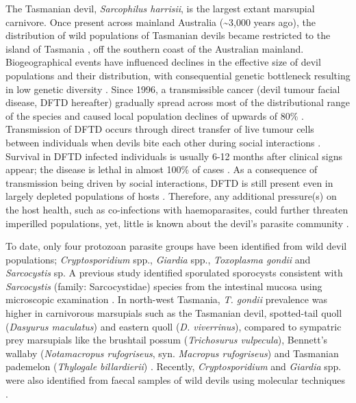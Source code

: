 \documentclass[a4paper, nobind]{templates/ociamthesis}
\begin{document}
The Tasmanian devil, \emph{Sarcophilus harrisii}, is the largest extant marsupial carnivore. Once present across mainland Australia (\textasciitilde3,000 years ago), the distribution of wild populations of Tasmanian devils became restricted to the island of Tasmania \autocite{bruniche-olsenAncientDNATracks2018}, off the southern coast of the Australian mainland. Biogeographical events have influenced declines in the effective size of devil populations and their distribution, with consequential genetic bottleneck resulting in low genetic diversity \autocite{jonesGeneticDiversityPopulation2004,bruniche-olsenAncientDNATracks2018,pattonContemporaryDemographicReconstruction2019}. Since 1996, a transmissible cancer (devil tumour facial disease, DFTD hereafter) gradually spread across most of the distributional range of the species and caused local population declines of upwards of 80\% \autocite{mccallumTransmissionDynamicsTasmanian2009,lazenbyDensityTrendsDemographic2018}. Transmission of DFTD occurs through direct transfer of live tumour cells between individuals when devils bite each other during social interactions \autocite{pearseAllograftTheoryTransmission2006,hamedeBitingInjuriesTransmission2013,hamiltonRateIntersexualInteractions2019}. Survival in DFTD infected individuals is usually 6-12 months after clinical signs appear; the disease is lethal in almost 100\% of cases \autocite{pyeDevilFacialTumor2016}. As a consequence of transmission being driven by social interactions, DFTD is still present even in largely depleted populations of hosts \autocite{mccallumTransmissionDynamicsTasmanian2009}. Therefore, any additional pressure(s) on the host health, such as co-infections with haemoparasites, could further threaten imperilled populations, yet, little is known about the devil's parasite community \autocite{waitReviewParasitesTasmanian2017}.

To date, only four protozoan parasite groups have been identified from wild devil populations; \emph{Cryptosporidium} spp., \emph{Giardia} spp., \emph{Toxoplasma gondii} and \emph{Sarcocystis} sp. A previous study identified sporulated sporocysts consistent with \emph{Sarcocystis} (family: Sarcocystidae) species from the intestinal mucosa using microscopic examination \autocite{mundaySarcocystisRelatedOrganisms1978}. In north-west Tasmania, \emph{T. gondii} prevalence was higher in carnivorous marsupials such as the Tasmanian devil, spotted-tail quoll (\emph{Dasyurus maculatus}) and eastern quoll (\emph{D. viverrinus}), compared to sympatric prey marsupials like the brushtail possum (\emph{Trichosurus vulpecula}), Bennett's wallaby (\emph{Notamacropus rufogriseus}, syn. \emph{Macropus rufogriseus}) and Tasmanian pademelon (\emph{Thylogale billardierii}) \autocite{hollingsWildlifeDiseaseEcology2013}. Recently, \emph{Cryptosporidium} and \emph{Giardia} spp. were also identified from faecal samples of wild devils using molecular techniques \autocite{waitMolecularCharacterizationCryptosporidium2017}.
\end{document}
